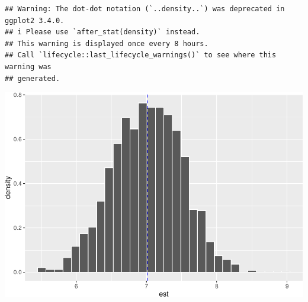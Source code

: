 \documentclass[
]{article}
\newenvironment{Shaded}{\begin{snugshade}}{\end{snugshade}}
\newcommand{\AttributeTok}[1]{\textcolor[rgb]{0.77,0.63,0.00}{#1}}
\newcommand{\DecValTok}[1]{\textcolor[rgb]{0.00,0.00,0.81}{#1}}
\newcommand{\FunctionTok}[1]{\textcolor[rgb]{0.00,0.00,0.00}{#1}}
\newcommand{\NormalTok}[1]{#1}
\newcommand{\SpecialCharTok}[1]{\textcolor[rgb]{0.00,0.00,0.00}{#1}}
\newcommand{\StringTok}[1]{\textcolor[rgb]{0.31,0.60,0.02}{#1}}
\begin{document}
\begin{Shaded}
\end{Shaded}

\begin{verbatim}
## Warning: The dot-dot notation (`..density..`) was deprecated in ggplot2 3.4.0.
## i Please use `after_stat(density)` instead.
## This warning is displayed once every 8 hours.
## Call `lifecycle::last_lifecycle_warnings()` to see where this warning was
## generated.
\end{verbatim}

\includegraphics{for_markdown_files/figure-latex/unnamed-chunk-9-1.pdf}
\end{document}
